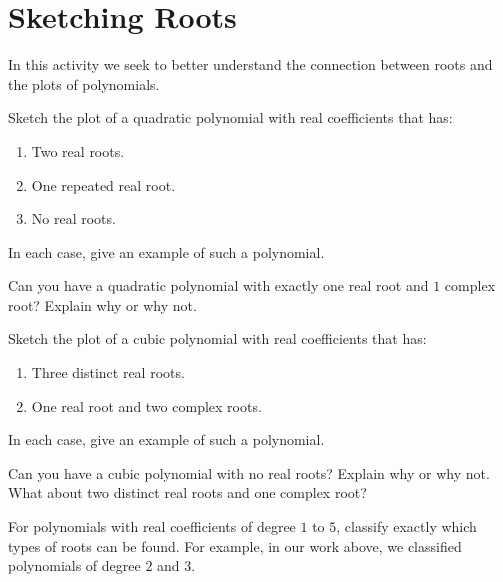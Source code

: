 \newpage
\section{Sketching Roots}\label{A:sketchRoots}

In this activity we seek to better understand the connection between
roots and the plots of polynomials.  

\begin{prob}
Sketch the plot of a quadratic polynomial with real coefficients that has:
\begin{enumerate}
\item Two real roots.
\item One repeated real root.
\item No real roots.
\end{enumerate}
In each case, give an example of such a polynomial.
\end{prob}

\begin{prob}
Can you have a quadratic polynomial with exactly one real root and
$1$ complex root?  Explain why or why not.
\end{prob}


\begin{prob}
Sketch the plot of a cubic polynomial with real coefficients that has:
\begin{enumerate}
\item Three distinct real roots.
\item One real root and two complex roots.
\end{enumerate}
In each case, give an example of such a polynomial.
\end{prob}

\begin{prob}
Can you have a cubic polynomial with no real roots?  Explain why or
why not. What about two distinct real roots and one complex root?
\end{prob}


\begin{prob}
For polynomials with real coefficients of degree $1$ to $5$, classify
exactly which types of roots can be found. For example, in our work
above, we classified polynomials of degree $2$ and $3$.
\end{prob}
